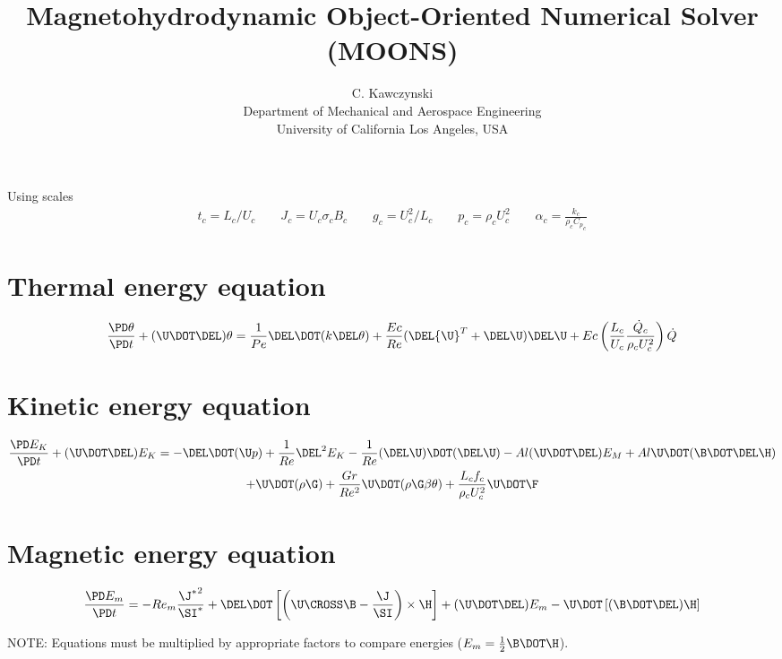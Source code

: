 \documentclass[11pt]{article}
\begin{document}
\doublespacing
\title{Magnetohydrodynamic Object-Oriented Numerical Solver (MOONS)}
\author{C. Kawczynski \\
Department of Mechanical and Aerospace Engineering \\
University of California Los Angeles, USA\\
}
\maketitle

Using scales
\begin{equation}\begin{aligned}
	t_c = L_c/ U_c \qquad
	J_c = U_c \sigma_c B_c \qquad
	g_c = U_c^2/L_c \qquad
	p_c = \rho_c U_c^2 \qquad
	\alpha_c = \frac{k_c}{\rho_c {C_p}_c}
\end{aligned}\end{equation}

\section{Thermal energy equation}
\begin{equation}
	\frac{\PD \theta}{\PD t}
	+ (\U \DOT \DEL) \theta
	= \frac{1}{Pe} \DEL \DOT (k \DEL \theta)
	+ \frac{Ec}{Re} ( \DEL {\U}^T + \DEL \U ) \DEL \U
	+ Ec \left( \frac{L_c}{U_c} \frac{\dot{Q}_c}{\rho_c U_c^2} \right) \dot{Q}
\end{equation}
\section{Kinetic energy equation}
\begin{multline}
	\frac{\PD E_K}{\PD t}
	+ (\U \DOT \DEL) E_K
	=
	- \DEL \DOT (\U p)
	+ \frac{1}{Re} \DEL^2 E_K
	- \frac{1}{Re} (\DEL \U) \DOT (\DEL \U)
	- Al (\U \DOT \DEL) E_M
	+ Al \U \DOT (\B \DOT \DEL \H) \\
	+ \U \DOT (\rho \G)
	+ \frac{Gr}{Re^2} \U \DOT (\rho \G \beta \theta)
	+ \frac{L_c f_c}{\rho_c U_c^2} \U \DOT \F
\end{multline}

\section{Magnetic energy equation}
\begin{equation}
	\frac{\PD E_m}{\PD t} =
	- Re_m \frac{{\J^*}^2}{\SI^*}
	+ \DEL \DOT \left[\left(\U \CROSS \B - \frac{\J}{\SI} \right) \times \H \right]
	+ (\U \DOT \DEL) E_m
	- \U \DOT \left[(\B \DOT \DEL) \H \right]
\end{equation}

NOTE: Equations must be multiplied by appropriate factors to compare energies ($E_m = \frac{1}{2} \B \DOT \H$).
\end{document}
